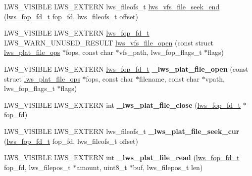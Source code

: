 \begin{DoxyCompactItemize}
L\+W\+S\+\_\+\+V\+I\+S\+I\+B\+LE L\+W\+S\+\_\+\+E\+X\+T\+E\+RN lws\+\_\+fileofs\+\_\+t \hyperlink{group__fops_gacedf2cfa8c82a3fa215a39713d0b88a4}{lws\+\_\+vfs\+\_\+file\+\_\+seek\+\_\+end} (\hyperlink{structlws__fop__fd}{lws\+\_\+fop\+\_\+fd\+\_\+t} fop\+\_\+fd, lws\+\_\+fileofs\+\_\+t offset)
\item 
L\+W\+S\+\_\+\+V\+I\+S\+I\+B\+LE L\+W\+S\+\_\+\+E\+X\+T\+E\+RN \hyperlink{structlws__fop__fd}{lws\+\_\+fop\+\_\+fd\+\_\+t} L\+W\+S\+\_\+\+W\+A\+R\+N\+\_\+\+U\+N\+U\+S\+E\+D\+\_\+\+R\+E\+S\+U\+LT \hyperlink{group__fops_gafde9d62b0140a9127129c76f6817e010}{lws\+\_\+vfs\+\_\+file\+\_\+open} (const struct \hyperlink{structlws__plat__file__ops}{lws\+\_\+plat\+\_\+file\+\_\+ops} $\ast$fops, const char $\ast$vfs\+\_\+path, lws\+\_\+fop\+\_\+flags\+\_\+t $\ast$flags)
\item 
\mbox{\label{group__fops_ga2278da04eda47b64ed212e175abcc3ff}} 
L\+W\+S\+\_\+\+V\+I\+S\+I\+B\+LE L\+W\+S\+\_\+\+E\+X\+T\+E\+RN \hyperlink{structlws__fop__fd}{lws\+\_\+fop\+\_\+fd\+\_\+t} {\bfseries \+\_\+lws\+\_\+plat\+\_\+file\+\_\+open} (const struct \hyperlink{structlws__plat__file__ops}{lws\+\_\+plat\+\_\+file\+\_\+ops} $\ast$fops, const char $\ast$filename, const char $\ast$vpath, lws\+\_\+fop\+\_\+flags\+\_\+t $\ast$flags)
\item 
\mbox{\label{group__fops_gaf46a9b237454c9d1408f66d24bd9ac09}} 
L\+W\+S\+\_\+\+V\+I\+S\+I\+B\+LE L\+W\+S\+\_\+\+E\+X\+T\+E\+RN int {\bfseries \+\_\+lws\+\_\+plat\+\_\+file\+\_\+close} (\hyperlink{structlws__fop__fd}{lws\+\_\+fop\+\_\+fd\+\_\+t} $\ast$fop\+\_\+fd)
\item 
\mbox{\label{group__fops_ga978cf727cc29c73545548a0dcb34000c}} 
L\+W\+S\+\_\+\+V\+I\+S\+I\+B\+LE L\+W\+S\+\_\+\+E\+X\+T\+E\+RN lws\+\_\+fileofs\+\_\+t {\bfseries \+\_\+lws\+\_\+plat\+\_\+file\+\_\+seek\+\_\+cur} (\hyperlink{structlws__fop__fd}{lws\+\_\+fop\+\_\+fd\+\_\+t} fop\+\_\+fd, lws\+\_\+fileofs\+\_\+t offset)
\item 
\mbox{\label{group__fops_ga8c67bcbfab1f7fb5f3965ca218ae2a44}} 
L\+W\+S\+\_\+\+V\+I\+S\+I\+B\+LE L\+W\+S\+\_\+\+E\+X\+T\+E\+RN int {\bfseries \+\_\+lws\+\_\+plat\+\_\+file\+\_\+read} (\hyperlink{structlws__fop__fd}{lws\+\_\+fop\+\_\+fd\+\_\+t} fop\+\_\+fd, lws\+\_\+filepos\+\_\+t $\ast$amount, uint8\+\_\+t $\ast$buf, lws\+\_\+filepos\+\_\+t len)
\item 

\end{DoxyCompactItemize}

